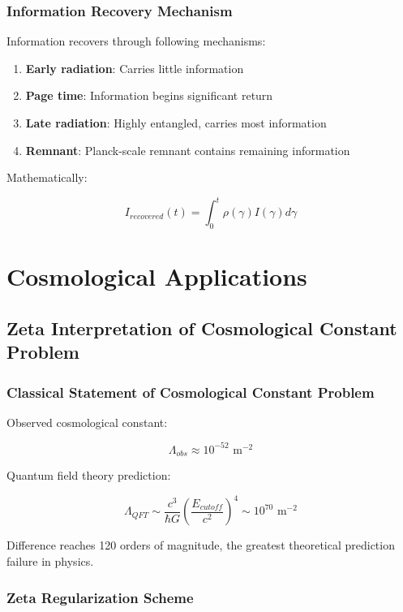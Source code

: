 \documentclass[12pt,a4paper]{article}
\begin{document}
\subsubsection{Information Recovery Mechanism}

Information recovers through following mechanisms:

\begin{enumerate}
\item \textbf{Early radiation}: Carries little information
\item \textbf{Page time}: Information begins significant return
\item \textbf{Late radiation}: Highly entangled, carries most information
\item \textbf{Remnant}: Planck-scale remnant contains remaining information
\end{enumerate}

Mathematically:

$$I_{recovered}(t) = \int_0^t \rho(\gamma) I(\gamma) d\gamma$$

\section{Cosmological Applications}

\subsection{Zeta Interpretation of Cosmological Constant Problem}

\subsubsection{Classical Statement of Cosmological Constant Problem}

Observed cosmological constant:

$$\Lambda_{obs} \approx 10^{-52} \text{ m}^{-2}$$

Quantum field theory prediction:

$$\Lambda_{QFT} \sim \frac{c^3}{\hbar G} \left(\frac{E_{cutoff}}{c^2}\right)^4 \sim 10^{70} \text{ m}^{-2}$$

Difference reaches 120 orders of magnitude, the greatest theoretical prediction failure in physics.

\subsubsection{Zeta Regularization Scheme}
\end{document}
